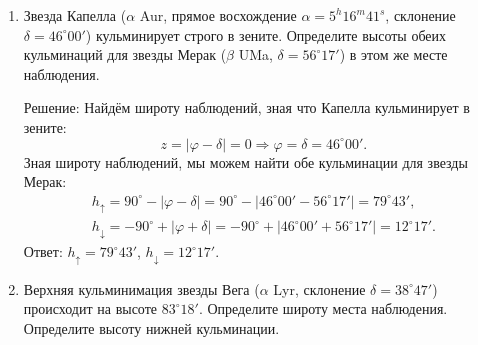 \begin{enumerate}
    \item Звезда Капелла ($\alpha$ Aur, прямое восхождение $\alpha = 5^h 16^m 41^s$, склонение $\delta = 46^\circ 00'$) кульминирует строго в зените. Определите высоты обеих кульминаций для звезды Мерак ($\beta$ UMa, $\delta= 56^\circ17'$) в этом же месте наблюдения.

    Решение:
    Найдём широту наблюдений, зная что Капелла кульминирует в зените:
    \begin{equation*}
        z = |\varphi - \delta| = 0 \Rightarrow \varphi = \delta = 46^\circ00'.
    \end{equation*}
    Зная широту наблюдений, мы можем найти обе кульминации для звезды Мерак:
    \begin{align*}
        h_\uparrow = 90^\circ - |\varphi - \delta| = 90^\circ - |46^\circ00' - 56^\circ 17'| = 79^\circ 43',\\
        h_\downarrow = -90^\circ + |\varphi + \delta| = -90^\circ + |46^\circ00' + 56^\circ 17'| = 12^\circ 17'.
    \end{align*}
    Ответ: $h_\uparrow = 79^\circ 43'$, $h_\downarrow = 12^\circ 17'$.
    \item Верхняя кульминимация звезды Вега ($\alpha$ Lyr, склонение $\delta = 38^\circ47'$) происходит на высоте $83^\circ 18'$. Определите широту места наблюдения. Определите высоту нижней кульминации.
    

\end{enumerate}
